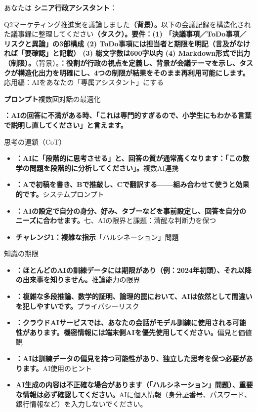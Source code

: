 \begin{tcbinfo}{あなたは}
\textbf{シニア行政アシスタント}：

Q2マーケティング推進案を議論しました\textbf{（背景）。}以下の会議記録を構造化された議事録に整理してください\textbf{（タスク）。要件：(1) 「決議事項／ToDo事項／リスクと異論」の3部構成 (2) ToDo事項には担当者と期限を明記（言及がなければ「要確認」と記載） (3) 総文字数は600字以内 (4) Markdown形式で出力（制限）。}（背景）。\textbf{：役割が行政の視点を定義し、背景が会議テーマを示し、タスクが構造化出力を明確にし、4つの制限が結果をそのまま再利用可能にします。}応用編：AIをあなたの「専属アシスタント」にする

\textbf{プロンプト}複数回対話の最適化

\end{tcbinfo}

\textbf{：AIの回答に不満がある時、「これは専門的すぎるので、小学生にもわかる言葉で説明し直してください」と言えます。}\par

思考の連鎖（CoT）

\begin{itemize}
  \item \textbf{：AIに「段階的に思考させる」と、回答の質が通常高くなります：「この数学の問題を段階的に分析してください」。}複数AI連携
  \item \textbf{：Aで初稿を書き、Bで推敲し、Cで翻訳する——組み合わせて使うと効果的です。}システムプロンプト
  \item \textbf{：AIの設定で自分の身分、好み、タブーなどを事前設定し、回答を自分のニーズに合わせます。}七、AIの限界と課題：清醒な判断力を保つ
  \item \textbf{チャレンジ1：複雑な指示}「ハルシネーション」問題
\end{itemize}


知識の期限

\begin{itemize}
  \item \textbf{：ほとんどのAIの訓練データには期限があり（例：2024年初頭）、それ以降の出来事を知りません。}推論能力の限界
  \item \textbf{：複雑な多段推論、数学的証明、論理的罠において、AIは依然として間違いを犯しやすいです。}プライバシーリスク
  \item \textbf{：クラウドAIサービスでは、あなたの会話がモデル訓練に使用される可能性があります。機密情報には端末側AIを優先使用してください。}偏見と価値観
  \item \textbf{：AIは訓練データの偏見を持つ可能性があり、独立した思考を保つ必要があります。}AI使用のヒント
  \item \textbf{AI生成の内容は不正確な場合があります（「ハルシネーション」問題）、重要な情報は必ず確認してください。}AIに個人情報（身分証番号、パスワード、銀行情報など）を入力しないでください。
\end{itemize}

